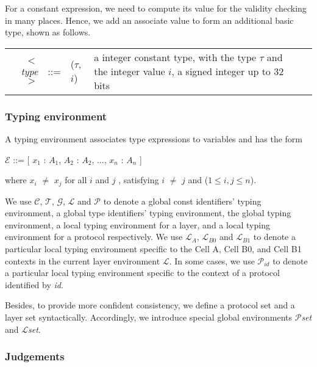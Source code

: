 \documentclass{article}
\begin{document}
For a constant expression, we need to compute its value for the validity checking in many places. Hence, we add an associate value to form an additional basic type, shown as follows.

    \small

        \begin{tabularx}{1.0\linewidth}{rm{1em}m{6em}m{22em}ll}
          $<$\textit{type}$>$    & ::= &  ($\tau$, $i$) & a integer constant type, with the type $\tau$ and the integer value $i$, a signed integer up to 32 bits
		\end{tabularx}
        \normalsize


\subsubsection{Typing environment}

A typing environment associates type expressions to variables and has the form

 \begin{center}
 $\mathcal{E}$ ::= [ $x_{1}$ : $A_{1}$, $A_{2}$ : $A_{2}$, ..., $x_{n}$ : $A_{n}$ ]
\end{center}
\begin{flushleft}
where $x_{i}$ $\neq$ $x_{j}$ for all $i$ and $j$ , satisfying $i$ $\neq$ $j$ and ($1\leq i, j \leq n$).
\end{flushleft}

We use $\mathcal{C}$, $\mathcal{T}$, $\mathcal{G}$, $\mathcal{L}$  and $\mathcal{P}$ to denote a global const identifiers' typing environment, a global type identifiers' typing environment, the global typing environment, a local typing environment for a layer, and a local typing environment for a protocol respectively. We use $\mathcal{L}_{A}$, $\mathcal{L}_{B0}$ and $\mathcal{L}_{B1}$ to denote a particular local typing environment specific to the Cell A, Cell B0, and Cell B1 contexts in the current layer environment $\mathcal{L}$. In some cases, we use $\mathcal{P}_{id}$ to denote a particular local typing environment specific to the context of a protocol identified by \textit{id}.

Besides, to provide more confident consistency, we define a protocol set and a layer set syntactically. Accordingly, we introduce special global environments $\mathcal{P}$\textit{set} and $\mathcal{L}$\textit{set}.

\subsubsection{Judgements}
\end{document}
